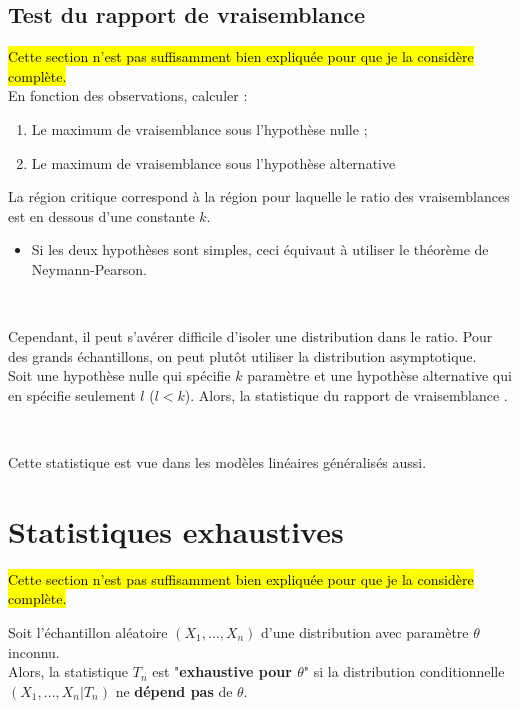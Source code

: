 \documentclass[10pt, french]{article}
\begin{document}
\begin{multicols*}{2}
\columnbreak
\subsection{Test du rapport de vraisemblance}
\hl{Cette section n'est pas suffisamment bien expliquée pour que je la considère complète.}\\

En fonction des observations, calculer :
\begin{enumerate}
	\item	Le maximum de vraisemblance sous l'hypothèse nulle ;
	\item	Le maximum de vraisemblance sous l'hypothèse alternative
\end{enumerate}
La région critique correspond à la région pour laquelle le ratio des vraisemblances est en dessous d'une constante $k$.
\begin{itemize}
	\item	Si les deux hypothèses sont simples, ceci équivaut à utiliser le théorème de Neymann-Pearson.
\end{itemize}
\

Cependant, il peut s'avérer difficile d'isoler une distribution dans le ratio. Pour des grands échantillons, on peut plutôt utiliser la distribution asymptotique.\\
Soit une hypothèse nulle qui spécifie $k$ paramètre et une hypothèse alternative qui en spécifie seulement $l$ ($l < k$). Alors, la statistique du rapport de vraisemblance .

\

Cette statistique est vue dans les modèles linéaires généralisés aussi.

\columnbreak
\section{Statistiques exhaustives}
\hl{Cette section n'est pas suffisamment bien expliquée pour que je la considère complète.}\\

\begin{definitionNOHFILL}
Soit l'échantillon aléatoire $(X_{1}, \dots, X_{n})$ d'une distribution avec paramètre $\theta$ inconnu.\\
Alors, la statistique $T_{n}$ est "\textbf{exhaustive pour $\theta$}" si la distribution conditionnelle $(X_{1}, \dots, X_{n} | T_{n})$ ne \textbf{dépend pas} de $\theta$.


\end{definitionNOHFILL}
\end{multicols*}
\end{document}
